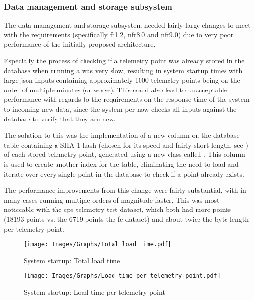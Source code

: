 \subsubsection{Data management and storage subsystem}
The data management and storage subsystem needed fairly large changes to meet with the requirements (specifically \acrshort{fr}1.2, \acrshort{nfr}8.0 and \acrshort{nfr}9.0) due to very poor performance of the initially proposed architecture.

Especially the process of checking if a telemetry point was already stored in the database when running a  was very slow, resulting in system startup times with large \acrshort{json} inputs containing approximately 1000 telemetry points being on the order of multiple minutes (or worse). This could also lead to unacceptable performance with regards to the requirements on the response time of the system to incoming new data, since the system per now checks all inputs against the database to verify that they are new.

The solution to this was the implementation of a new column on the database table containing a SHA-1 \gls{hash} (chosen for its speed and fairly short length, see \cite{hashspeed}) of each stored telemetry point, generated using a new class called . This column is used to create another index for the  table, eliminating the need to load and iterate over every single point in the database to check if a point already exists.

The performance improvements from this change were fairly substantial, with  in many cases running multiple orders of magnitude faster. This was most noticeable with the \acrshort{eps} telemetry test dataset, which both had more points (18193 points vs. the 6719 points the \acrshort{fc} dataset) and about twice the byte length per telemetry point.

\begin{figure}[ht]
  \centering
  \texttt{[image: Images/Graphs/Total load time.pdf]}
  \caption{System startup: Total load time}
  \label{fig:perf_time}
\end{figure}

\begin{figure}[ht]
  \centering
  \texttt{[image: Images/Graphs/Load time per telemetry point.pdf]}
  \caption{System startup: Load time per telemetry point}
  \label{fig:perf_time_per_point}
\end{figure}

